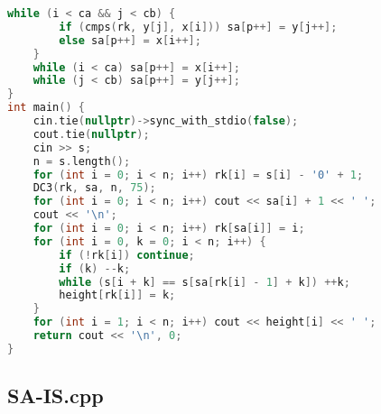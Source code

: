 \documentclass[9pt, a4paper, oneside]{book}
\begin{document}
\begin{lstlisting}[language={C++}]
    while (i < ca && j < cb) {
        if (cmps(rk, y[j], x[i])) sa[p++] = y[j++];
        else sa[p++] = x[i++];
    }
    while (i < ca) sa[p++] = x[i++];
    while (j < cb) sa[p++] = y[j++];
}
int main() {
    cin.tie(nullptr)->sync_with_stdio(false);
    cout.tie(nullptr);
    cin >> s;
    n = s.length();
    for (int i = 0; i < n; i++) rk[i] = s[i] - '0' + 1;
    DC3(rk, sa, n, 75);
    for (int i = 0; i < n; i++) cout << sa[i] + 1 << ' ';
    cout << '\n';
    for (int i = 0; i < n; i++) rk[sa[i]] = i;
    for (int i = 0, k = 0; i < n; i++) {
        if (!rk[i]) continue;
        if (k) --k;
        while (s[i + k] == s[sa[rk[i] - 1] + k]) ++k;
        height[rk[i]] = k;
    }
    for (int i = 1; i < n; i++) cout << height[i] << ' ';
    return cout << '\n', 0;
}\end{lstlisting}
\subsection{SA-IS.cpp}
\end{document}
